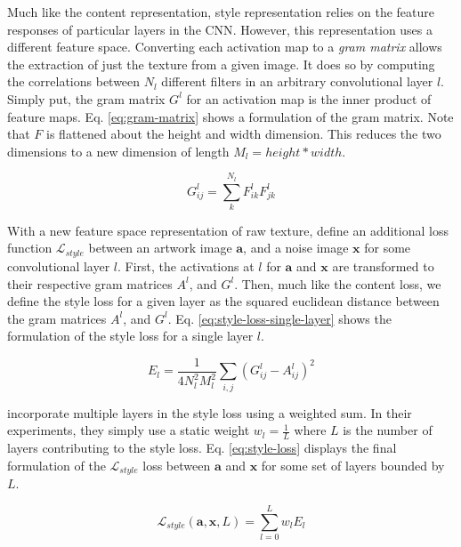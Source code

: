 \documentclass{article}
\begin{document}
Much like the content representation, style representation relies on the
feature responses of particular layers in the \ac{CNN}. However, this
representation uses a different feature space. Converting each activation
map to a \textit{gram matrix} allows the extraction of just the texture from
a given image. It does so by computing the correlations between $N_l$
different filters in an arbitrary convolutional layer $l$. Simply put, the
gram matrix $G^l$ for an activation map is the inner product of feature maps.
Eq. \ref{eq:gram-matrix} shows a formulation of the gram matrix. Note that
$F$ is flattened about the height and width dimension. This reduces the two
dimensions to a new dimension of length $M_l = height * width$.

\begin{equation}
\label{eq:gram-matrix}
G_{i j}^l = \sum_{k}^{N_l} F_{i k}^l F_{j k}^l
\end{equation}

With a new feature space representation of raw texture,
\cite{2015arXiv150806576G} define an additional loss function
$\mathcal{L}_{style}$ between an artwork image $\textbf{a}$, and a noise image
$\textbf{x}$ for some convolutional layer $l$. First, the activations at $l$
for $\textbf{a}$ and $\textbf{x}$ are transformed to their respective gram
matrices $A^l$, and $G^l$. Then, much like the content loss, we define
the style loss for a given layer as the squared euclidean distance between the
gram matrices $A^l$, and $G^l$. Eq. \ref{eq:style-loss-single-layer} shows the
formulation of the style loss for a single layer $l$.

\begin{equation}
\label{eq:style-loss-single-layer}
E_l = \frac{1}{4 N_l^2 M_l^2} \sum_{i,j} (G^l_{ij} - A^l_{ij})^2
\end{equation}

\cite{2015arXiv150806576G} incorporate multiple layers in the style loss using
a weighted sum. In their experiments, they simply use a static weight
$w_l = \frac{1}{L}$ where $L$ is the number of layers contributing to the
style loss. Eq. \ref{eq:style-loss} displays the final formulation of the
$\mathcal{L}_{style}$ loss between $\textbf{a}$ and $\textbf{x}$ for some set
of layers bounded by $L$.

\begin{equation}
\label{eq:style-loss}
\mathcal{L}_{style}(\mathbf{a}, \mathbf{x}, L) = \sum_{l=0}^L w_l E_l
\end{equation}
\end{document}
